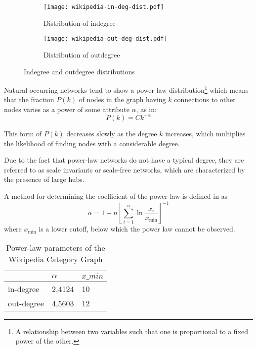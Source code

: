 \begin{figure}[!h]
\centering
\begin{subfigure}{0.49\textwidth}
\centering
\texttt{[image: wikipedia-in-deg-dist.pdf]}
\caption{Distribution of indegree}
\label{fig:left}
\end{subfigure}
\begin{subfigure}{0.49\textwidth}
\centering
\texttt{[image: wikipedia-out-deg-dist.pdf]}
\caption{Distribution of outdegree}
\label{fig:right}
\end{subfigure}
\caption{Indegree and outdegree distributions}
\label{fig:in-and-out-degree}
\end{figure}
Natural occurring networks tend to show a power-law distribution\footnote{A relationship between two variables such that one is proportional to a fixed power of the other.} which means that the fraction $P(k)$ of nodes in the graph having $k$ connections to other nodes varies as a power of some attribute $\alpha$, as in: 
\begin{equation}
P(k)=Ck^{-\alpha}
\end{equation}

This form of $P(k)$ decreases slowly as the degree $k$ increases, which multiplies the likelihood of finding nodes with a considerable degree.

Due to the fact that power-law networks do not have a typical degree, they are referred to as scale invariants or scale-free networks, which are characterized by the presence of large hubs\cite{mihalcea2011graph}. 

A method for determining the coefficient of the power law is defined in \cite{clauset2009power} as \begin{equation}
\alpha = 1 +n\left[\sum_{i=1}^n\ln\frac{x_i}{x_{\min}}\right]^{-1}
\end{equation}
where $x_{\min}$ is a lower cutoff, below which the power law cannot be observed. 


\begin{table}[ht!]
\centering
\begin{tabular}{@{}lll@{}}
\toprule
           & $\alpha$ & $x\_{min}$ \\ \midrule
in-degree  & 2,4124 & 10         \\
out-degree & 4,5603 & 12         \\ \bottomrule
\end{tabular}
\caption{Power-law parameters of the Wikipedia Category Graph}
\label{tab:power-law-params}
\end{table}

